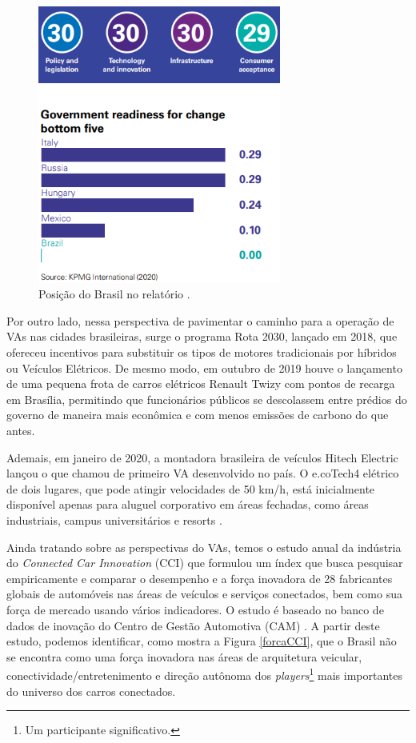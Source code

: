 \begin{figure}[H]
\centering
\includegraphics[width=8cm]{Figures/rank30.png}
\caption{Posição do Brasil no relatório \cite{KPMG}.}
\label{rank30}
\end{figure}

Por outro lado, nessa perspectiva de pavimentar o caminho para a operação de VAs nas cidades brasileiras, surge o programa Rota 2030, lançado em 2018, que ofereceu incentivos para substituir os tipos de motores tradicionais por híbridos ou Veículos Elétricos. De mesmo modo, em outubro de 2019 houve o lançamento de uma pequena frota de carros elétricos Renault Twizy com pontos de recarga em Brasília, permitindo que funcionários públicos se descolassem entre prédios do governo de maneira mais econômica e com menos emissões de carbono do que antes.

Ademais, em janeiro de 2020, a montadora brasileira de veículos Hitech Electric lançou o que chamou de primeiro VA desenvolvido no país. O e.coTech4 elétrico de dois lugares, que pode atingir velocidades de 50 km/h, está inicialmente disponível apenas para aluguel corporativo em áreas fechadas, como áreas industriais, campus universitários e resorts \cite{KPMG}.


Ainda tratando sobre as perspectivas do VAs, temos o estudo anual da indústria do \textit{Connected Car Innovation} (CCI) que formulou um índex que busca pesquisar empiricamente e comparar o desempenho e a força inovadora de 28 fabricantes globais de automóveis nas áreas de veículos e serviços conectados, bem como sua força de mercado usando vários indicadores. O estudo é baseado no banco de dados de inovação do Centro de Gestão Automotiva (CAM) \cite{CCI}. A partir deste estudo, podemos identificar, como mostra a Figura \ref{forcaCCI}, que o Brasil não se encontra como uma força inovadora nas áreas de arquitetura veicular, conectividade/entretenimento e direção autônoma dos \textit{players}\footnote{Um participante significativo.} mais importantes do universo dos carros conectados.


